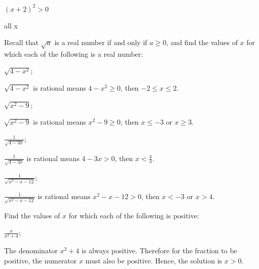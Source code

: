 \begin{questions}
\begin{solution}
\begin{tasks}
{\begin{note}
        $ (x+2)^2 > 0 $

      \end{note}
      all x
      }
    \end{tasks}
  \end{solution}
  \item Recall that $\sqrt{a}$ is a real number if and only if $a \geq 0$, and find the values of $x$ for which each of the following is a real number:
  \begin{tasks}
    \task $\sqrt{4-x^2}$;

    \begin{solution}
      $\sqrt{4-x^2}$ is rational means $4-x^2 \geq 0$, then $-2 \leq x \leq 2$.
    \end{solution}

    \task $\sqrt{x^2-9}$;

    \begin{solution}
      $\sqrt{x^2-9}$ is rational means $x^2-9 \geq 0$, then $x \leq -3$ or $x \geq 3$.
    \end{solution}

    \task \(\frac{1}{\sqrt{4-3x}}\);

    \begin{solution}
      \(\frac{1}{\sqrt{4-3x}}\) is rational means $4-3x>0$, then \(x < \frac{4}{3}\).
    \end{solution}

    \task \(\frac{1}{\sqrt{x^2-x-12}}\);

    \begin{solution}
      \(\frac{1}{\sqrt{x^2-x-12}}\) is rational means $x^2-x-12>0$, then $x<-3$ or $x>4$.
    \end{solution}

  \end{tasks}

  \item Find the values of $x$ for which each of the following is positive:
  \begin{tasks}
    \task \(\frac{x}{x^2+4}\);

    \begin{solution}
      The denominator $x^2+4$ is always positive. Therefore for the fraction to be positive, the numerator $x$ must also be positive. Hence, the solution is $x>0$.
    \end{solution}


\end{tasks}
\end{questions}
